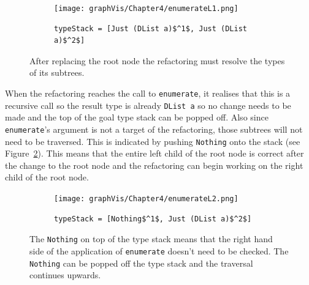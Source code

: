 \begin{figure}[t]
	\begin{subfigure}{\linewidth}
		\texttt{[image: graphVis/Chapter4/enumerateL1.png]}
	\end{subfigure}\par\medskip

	\begin{subfigure}{\linewidth}
		\begin{lstlisting}[mathescape]
			typeStack = [Just (DList a)$^1$, Just (DList a)$^2$]
		\end{lstlisting}
	\end{subfigure}\par\medskip
\caption{After replacing the root node the refactoring must resolve the types of its subtrees.}
\label{enumStateL1}
\end{figure} 

When the refactoring reaches the call to \texttt{enumerate}, it realises that this is a recursive call so the result type is already \texttt{DList a} so no change needs to be made and the top of the goal type stack can be popped off. Also since \texttt{enumerate}'s argument is not a target of the refactoring, those subtrees will not need to be traversed. This is indicated by pushing \texttt{Nothing} onto the stack (see Figure~\ref{enumStateL2}). This means that the entire left child of the root node is correct after the change to the root node and the refactoring can begin working on the right child of the root node.

\begin{figure}[t]
	\begin{subfigure}{\linewidth}
		\texttt{[image: graphVis/Chapter4/enumerateL2.png]}
	\end{subfigure}\par\medskip

	\begin{subfigure}{\linewidth}
		\begin{lstlisting}[mathescape]
			typeStack = [Nothing$^1$, Just (DList a)$^2$]
		\end{lstlisting}
	\end{subfigure}\par\medskip
\caption{The \texttt{Nothing} on top of the type stack means that the right hand side of the application of \texttt{enumerate} doesn't need to be checked. The \texttt{Nothing} can be popped off the type stack and the traversal continues upwards.}
\label{enumStateL2}
\end{figure}

